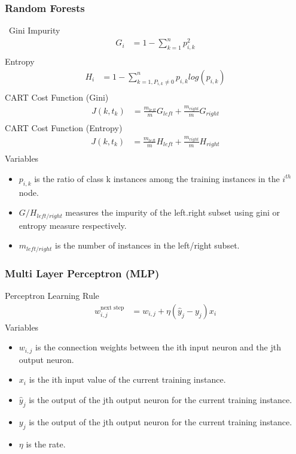 \documentclass[12pt]{article}
\begin{document}
\subsubsection{Random Forests}\label{rf-math}\
Gini Impurity
\begin{align}
	G_{i} &= 1 - \sum_{k=1}^{n}p_{i,k}^{2}\\
\end{align}
Entropy
\begin{align}
	H_{i} &= 1 - \sum_{k=1,P_{i,k}\neq 0}^{n}p_{i,k}log(p_{i,k})\\
\end{align}
CART Cost Function (Gini)
\begin{align}
	J(k,t_k) &= \frac{m_{left}}{m}G_{left} + \frac{m_{right}}{m}G_{right}\\
\end{align}
CART Cost Function (Entropy)
\begin{align}
	J(k,t_k) &= \frac{m_{left}}{m}H_{left} + \frac{m_{right}}{m}H_{right}\\
\end{align}
Variables
\begin{itemize}
	\item $p_{i,k}$ is the ratio of class k instances among the training instances in the $i^{th}$ node.
	\item $G/H_{left/right}$ measures the impurity of the left.right subset using gini or entropy measure respectively.
	\item $m_{left/right}$ is the number of instances in the left/right subset.
\end{itemize}
\subsubsection{Multi Layer Perceptron (MLP)}\label{mlp-math}
Perceptron Learning Rule
\begin{align}
	w_{i,j}^{\text{next step}} &= w_{i,j} + \eta (\hat{y}_j - y_j)x_i 
\end{align}
Variables
\begin{itemize}
	\item $w_{i,j}$ is the connection weights between the ith input neuron and the jth output neuron. 
	\item $x_i$ is the ith input value of the current training instance.
	\item $\hat{y}_{j}$ is the output of the jth output neuron for the current training instance.
	\item $y_{j}$ is the output of the jth output neuron for the current training instance.
	\item $\eta$ is the rate.
\end{itemize}
\end{document}
